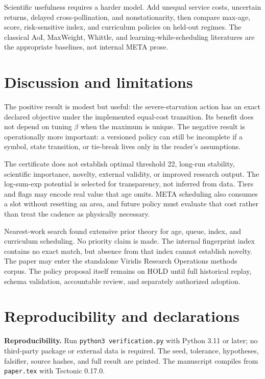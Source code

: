 \documentclass[10pt]{article}
\begin{document}
Scientific usefulness requires a harder model.  Add unequal service costs,
uncertain returns, delayed cross-pollination, and nonstationarity, then compare
max-age, score, risk-sensitive index, and curriculum policies on held-out
regimes.  The classical AoI, MaxWeight, Whittle, and learning-while-scheduling
literatures are the appropriate baselines, not internal META prose.

\section{Discussion and limitations}

The positive result is modest but useful: the severe-starvation action has an
exact declared objective under the implemented equal-cost transition.  Its
benefit does not depend on tuning $\beta$ when the maximum is unique.  The
negative result is operationally more important: a versioned policy can still
be incomplete if a symbol, state transition, or tie-break lives only in the
reader's assumptions.

The certificate does not establish optimal threshold 22, long-run stability,
scientific importance, novelty, external validity, or improved research output.
The log-sum-exp potential is selected for transparency, not inferred from data.
Tiers and flags may encode real value that age omits.  META scheduling also
consumes a slot without resetting an area, and future policy must evaluate that
cost rather than treat the cadence as physically necessary.

Nearest-work search found extensive prior theory for age, queue, index, and
curriculum scheduling.  No priority claim is made.  The internal fingerprint
index contains no exact match, but absence from that index cannot establish
novelty.  The paper may enter the standalone Viridis Research Operations
methods corpus.  The policy proposal itself remains on HOLD until full
historical replay, schema validation, accountable review, and separately
authorized adoption.

\section{Reproducibility and declarations}

\textbf{Reproducibility.} Run \texttt{python3 verification.py} with Python
3.11 or later; no third-party package or external data is required.  The seed,
tolerance, hypotheses, falsifier, source hashes, and full result are printed.
The manuscript compiles from \texttt{paper.tex} with Tectonic 0.17.0.
\end{document}
